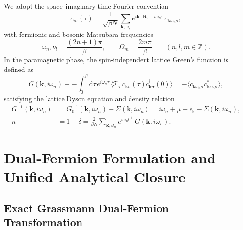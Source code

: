 \documentclass[11pt,a4paper]{article}
\numberwithin{equation}{section}
\theoremstyle{plain}
\theoremstyle{definition}
\providecommand{\vk}{\mathbf{k}}
\providecommand{\vR}{\mathbf{R}}
\providecommand{\dd}{\mathrm{d}}
\begin{document}
We adopt the space--imaginary-time Fourier convention
\begin{equation}
    c_{i\sigma}(\tau) = \frac{1}{\sqrt{\beta N}} \sum_{\vk,\omega_n}
        e^{i\vk\cdot\vR_i - i\omega_n \tau}\, c_{\vk\omega_n\sigma},
    \label{eq:fourier}
\end{equation}
with fermionic and bosonic Matsubara frequencies
\begin{equation}
    \omega_n, \nu_l = \frac{(2n+1)\pi}{\beta}, \qquad
    \Omega_m = \frac{2m\pi}{\beta} \qquad (n,l,m \in \mathbb{Z}).
    \label{eq:matsubara}
\end{equation}
In the paramagnetic phase, the spin-independent lattice Green's function is defined as
\begin{equation}
    G(\vk,i\omega_n)
    \equiv -\int_0^\beta \dd\tau\, e^{i\omega_n \tau}\,
        \bigl\langle \mathcal{T}_\tau\, c_{\vk\sigma}(\tau) c^\dagger_{\vk\sigma}(0) \bigr\rangle
    = -\bigl\langle c_{\vk\omega_n\sigma} c^*_{\vk\omega_n\sigma} \bigr\rangle,
    \label{eq:G_def}
\end{equation}
satisfying the lattice Dyson equation and density relation
\begin{align}
    G^{-1}(\vk,i\omega_n)
    &= G_0^{-1}(\vk,i\omega_n) - \Sigma(\vk,i\omega_n)
     = i\omega_n + \mu - \epsilon_{\vk} - \Sigma(\vk,i\omega_n),
    \label{eq:dyson} \\
    n &= 1 - \delta = \frac{2}{\beta N} \sum_{\vk,\omega_n} e^{i\omega_n 0^+}\, G(\vk,i\omega_n).
    \label{eq:density}
\end{align}

\section{Dual-Fermion Formulation and Unified Analytical Closure}
\label{sec:framework}

\subsection{Exact Grassmann Dual-Fermion Transformation}
\label{sec:exact_df}
\end{document}
